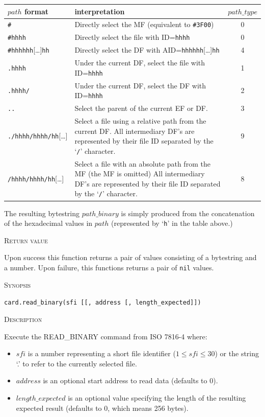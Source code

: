 \documentclass[11pt]{report}
\newcommand{\mansection}[1]{\vspace{0.5em}\par\noindent\textsc{#1}\vspace{0.5em}\par}
\begin{document}
  \begin{table}[!hbp]
  \begin{tabular}{|l|p{7cm}|c|}
  \hline
  $path$ format 
  & interpretation
  & $path\_type$ \\
  \hline
  \hline
  \texttt{\#}
  & Directly select the MF (equivalent to \texttt{\#3F00})
  & 0 \\
  \hline
  \texttt{\#hhhh}
  & Directly select the file with ID=\texttt{hhhh}
  & 0 \\
  \hline
  \texttt{\#hhhhhh}[\ldots ]\texttt{hh}
  & Directly select the DF with AID=\texttt{hhhhhh}[\ldots ]\texttt{hh}    
  & 4 \\
  \hline
  \hline
  \texttt{.hhhh}
  & Under the current DF, select the file with ID=\texttt{hhhh} 
  & 1 \\
  \hline
  \texttt{.hhhh/}
  & Under the current DF, select the DF with ID=\texttt{hhhh}   
  & 2 \\
  \hline
  \texttt{..} 
  & Select the parent of the current EF or DF.
  & 3 \\
  \hline
  \hline
  \texttt{./hhhh/hhhh/hh}[\ldots ]
  & Select a file using a relative path from the current DF. 
    All intermediary DF's are represented by their file ID 
    separated by the `\texttt{/}' character.
  & 9 \\
  \hline
  \texttt{/hhhh/hhhh/hh}[\ldots ] 
  & Select a file with an absolute path from the MF (the MF is omitted) 
    All intermediary DF's are represented by their file ID 
    separated by the `\texttt{/}' character.
   & 8 \\
  \hline
  \end{tabular}
  \end{table}
  

  The resulting bytestring $path\_binary$ is simply produced from the concatenation 
  of the hexadecimal values in $path$ (represented by `\texttt{h}' in the table above.)

\mansection{Return value}
  Upon success this function returns a pair of values consisting of a bytestring and a number.
  Upon failure, this functions returns a pair of \texttt{nil} values.


\mansection{Synopsis}
\texttt{card.read\_binary(sfi [[, address [, length\_expected]])}


\mansection{Description}
  Execute the READ\_BINARY command from ISO 7816-4 where:
  \begin{itemize}
  \item{$sfi$ is a number representing a short file identifier ($1\le sfi \le 30$) or the string `.' to refer to the currently selected file.}
  \item{$address$ is an optional start address to read data (defaults to 0).}
  \item{$length\_expected$ is an optional value specifying the length of the resulting expected result (defaults to 0, which means 256 bytes).}
  \end{itemize}
\end{document}
